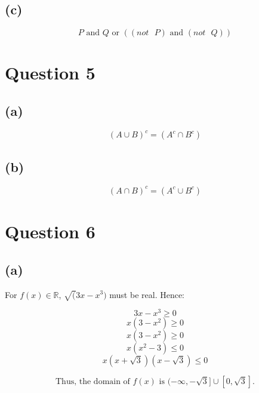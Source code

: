 \documentclass[11pt]{article}
\begin{document}
\subsection{(c)}
\label{sec:orgec27c78}

\[P \text{ and } Q \text{ or } ((not \text{ } P) \text{ and } (not \text{ } Q))\]

\newpage

\section{Question 5}
\label{sec:orgd29172a}

\subsection{(a)}
\label{sec:orge70be2a}

\[(A \cup B)^c = (A^c \cap B^c)\]

\subsection{(b)}
\label{sec:org86d8173}

\[(A \cap B)^c = (A^c \cup B^c)\]


\section{Question 6}
\label{sec:orgab83a65}

\subsection{(a)}
\label{sec:orgaf47640}

For \(f(x) \in \mathbb{R}\), \(\sqrt(3x - x^3)\) must be real. Hence:

\[3x - x^3 \ge 0 \]
\[x(3 - x^2) \ge 0 \]
\[x(3 - x^2) \ge 0 \]
\[x(x^2 - 3) \le 0 \]
\[x(x + \sqrt{3})(x - \sqrt{3}) \le 0\]

\begin{center}
\end{center}

\[\text{Thus, the domain of } f(x) \text{ is } (-\infty, -\sqrt{3}] \cup [0, \sqrt{3}].\]
\end{document}
